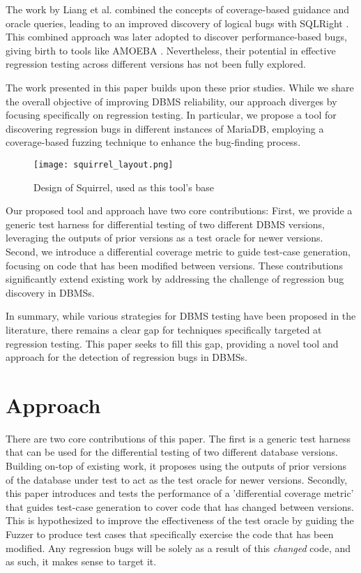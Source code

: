 \documentclass[sigconf]{acmart}
\begin{document}
The work by Liang et al. combined the concepts of coverage-based guidance and oracle queries, leading to an improved discovery of logical bugs with SQLRight . This combined approach was later adopted to discover performance-based bugs, giving birth to tools like AMOEBA . Nevertheless, their potential in effective regression testing across different versions has not been fully explored.

The work presented in this paper builds upon these prior studies. While we share the overall objective of improving DBMS reliability, our approach diverges by focusing specifically on regression testing. In particular, we propose a tool for discovering regression bugs in different instances of MariaDB, employing a coverage-based fuzzing technique to enhance the bug-finding process.

\begin{figure}[H]
\centering
\texttt{[image: squirrel\_layout.png]}
\caption{Design of Squirrel, used as this tool's base }
\label{fig:Squirrel_execution_flow}
\end{figure}

Our proposed tool and approach have two core contributions: First, we provide a generic test harness for differential testing of two different DBMS versions, leveraging the outputs of prior versions as a test oracle for newer versions. Second, we introduce a differential coverage metric to guide test-case generation, focusing on code that has been modified between versions. These contributions significantly extend existing work by addressing the challenge of regression bug discovery in DBMSs.

In summary, while various strategies for DBMS testing have been proposed in the literature, there remains a clear gap for techniques specifically targeted at regression testing. This paper seeks to fill this gap, providing a novel tool and approach for the detection of regression bugs in DBMSs.


\section{Approach}

There are two core contributions of this paper. The first is a generic test harness that can be used for the differential testing of two different database versions. Building on-top of existing work, it proposes using the outputs of prior versions of the database under test to act as the test oracle for newer versions. Secondly, this paper introduces and tests the performance of a 'differential coverage metric' that guides test-case generation to cover code that has changed between versions. This is hypothesized to improve the effectiveness of the test oracle by guiding the Fuzzer to produce test cases that specifically exercise the code that has been modified. Any regression bugs will be solely as a result of this \textit{changed} code, and as such, it makes sense to target it.
\end{document}
